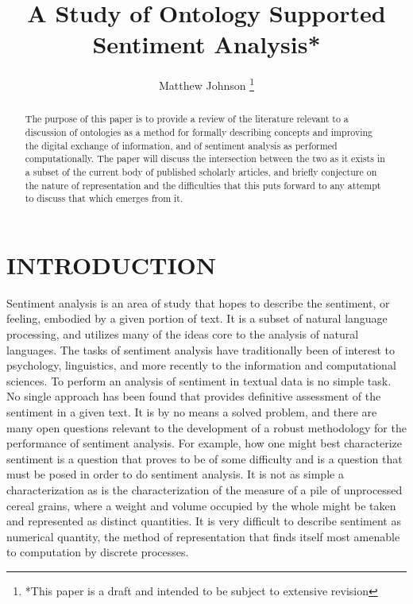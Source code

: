\documentclass[letterpaper, 10 pt, conference]{ieeeconf}
\title{A Study of Ontology Supported Sentiment Analysis*}
\author{Matthew Johnson \thanks{*This paper is a draft and intended to be subject to extensive revision}}
\begin{document}
\maketitle

\begin{abstract}
The purpose of this paper is to provide a review of the literature relevant to a discussion of ontologies as a method for formally describing concepts and improving the digital exchange of information, and of sentiment analysis as performed computationally. The paper will discuss the intersection between the two as it exists in a subset of the current body of published scholarly articles, and briefly conjecture on the nature of representation and the difficulties that this puts forward to any attempt to discuss that which emerges from it.
\end{abstract}

\section{INTRODUCTION}
Sentiment analysis is an area of study that hopes to describe the sentiment, or feeling, embodied by a given portion of text. It is a subset of natural language processing, and utilizes many of the ideas core to the analysis of natural languages. The tasks of sentiment analysis have traditionally been of interest to psychology, linguistics, and more recently to the information and computational sciences. To perform an analysis of sentiment in textual data is no simple task. No single approach has been found that provides definitive assessment of the sentiment in a given text. It is by no means a solved problem, and there are many open questions relevant to the development of a robust methodology for the performance of sentiment analysis. For example, how one might best characterize sentiment is a question that proves to be of some difficulty and is a question that must be posed in order to do sentiment analysis. It is not as simple a characterization as is the characterization of the measure of a pile of unprocessed cereal grains, where a weight and volume occupied by the whole might be taken and represented as distinct quantities. It is very difficult to describe sentiment as numerical quantity, the method of representation that finds itself most amenable to computation by discrete processes.
\end{document}
